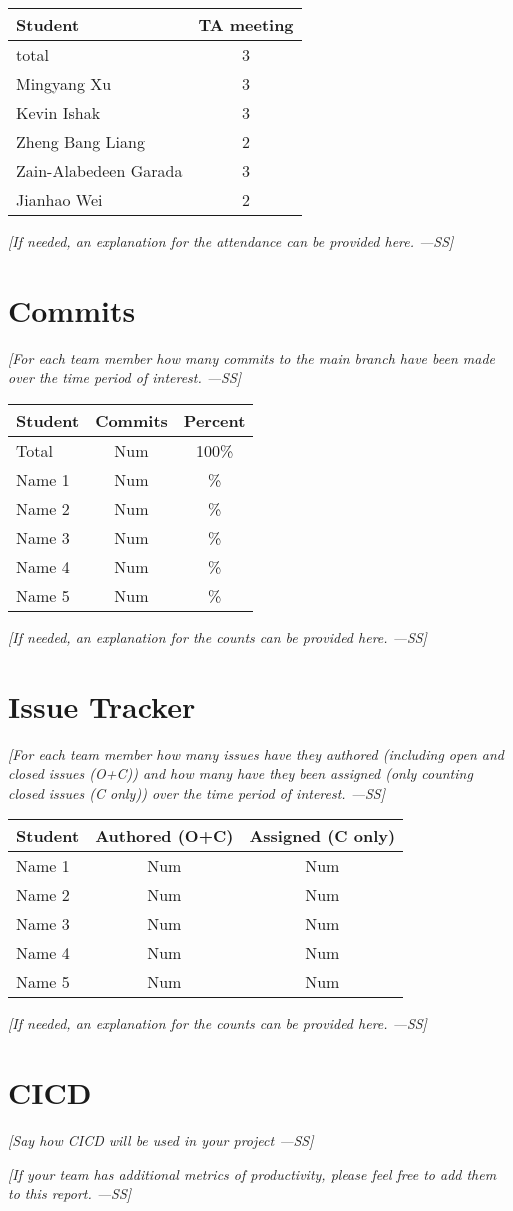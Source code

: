 \documentclass[12pt]{article}
\begin{document}
\begin{longtable}{|l|c|}
\hline
\textbf{Student} & \textbf{TA meeting} \\
\hline
total & 3 \\
Mingyang Xu & 3 \\
Kevin Ishak & 3 \\
Zheng Bang Liang & 2 \\
Zain-Alabedeen Garada & 3 \\
Jianhao Wei & 2 \\
\hline
\end{longtable}

\textit{[If needed, an explanation for the attendance can be provided here. ---SS]}

\section{Commits}
\textit{[For each team member how many commits to the main branch have been made over the time period of interest. ---SS]}

\begin{longtable}{|l|c|c|}
\hline
\textbf{Student} & \textbf{Commits} & \textbf{Percent} \\
\hline
Total & Num & 100\% \\
Name 1 & Num & \% \\
Name 2 & Num & \% \\
Name 3 & Num & \% \\
Name 4 & Num & \% \\
Name 5 & Num & \% \\
\hline
\end{longtable}

\textit{[If needed, an explanation for the counts can be provided here. ---SS]}

\section{Issue Tracker}
\textit{[For each team member how many issues have they authored (including open and closed issues (O+C)) and how many have they been assigned (only counting closed issues (C only)) over the time period of interest. ---SS]}

\begin{longtable}{|l|c|c|}
\hline
\textbf{Student} & \textbf{Authored (O+C)} & \textbf{Assigned (C only)} \\
\hline
Name 1 & Num & Num \\
Name 2 & Num & Num \\
Name 3 & Num & Num \\
Name 4 & Num & Num \\
Name 5 & Num & Num \\
\hline
\end{longtable}

\textit{[If needed, an explanation for the counts can be provided here. ---SS]}

\section{CICD}
\textit{[Say how CICD will be used in your project ---SS]}

\textit{[If your team has additional metrics of productivity, please feel free to add them to this report. ---SS]}
\end{document}
